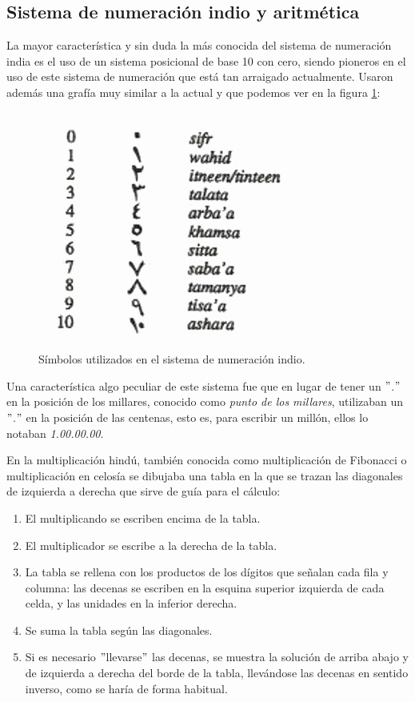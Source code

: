 \documentclass[a4paper, 11pt]{article}
\begin{document}
	\subsection{Sistema de numeración indio y aritmética}
		La mayor característica y sin duda la más conocida del sistema de numeración india es el uso de un sistema posicional
		de base 10 con cero, siendo pioneros en el uso de este sistema de numeración que está tan arraigado actualmente.
		Usaron además una grafía muy similar a la actual y que podemos ver en la figura \ref{fig:ind_numbers}:
		\begin{figure}[!ht]
			\centering
			\includegraphics[width = 7 cm]{indian_numbers.jpg}
			\caption{Símbolos utilizados en el sistema de numeración indio.}
			\label{fig:ind_numbers}
		\end{figure}

		Una característica algo peculiar de este sistema fue que en lugar de tener un $"$.$"$ en la posición de los millares,
		conocido como \textit{punto de los millares}, utilizaban un $"$.$"$ en la posición de las centenas, esto es, para
		escribir un millón, ellos lo notaban \textit{1.00.00.00}.

		En la multiplicación hindú, también conocida como multiplicación de Fibonacci o multiplicación en celosía se
		dibujaba una tabla en la que se trazan las diagonales de izquierda a derecha que sirve de guía para el cálculo:
		\begin{enumerate}
			\item El multiplicando se escriben encima de la tabla.
			\item El multiplicador se escribe a la derecha de la tabla.
			\item La tabla se rellena con los productos de los dígitos que señalan cada fila y columna: las decenas se
			escriben en la esquina superior izquierda de cada celda, y las unidades en la inferior derecha.
			\item Se suma la tabla según las diagonales.
			\item Si es necesario $"$llevarse$"$ las decenas, se muestra la solución de arriba abajo y de izquierda a
			derecha del borde de la tabla, llevándose las decenas en sentido inverso, como se haría de forma habitual.
		\end{enumerate}
\end{document}
